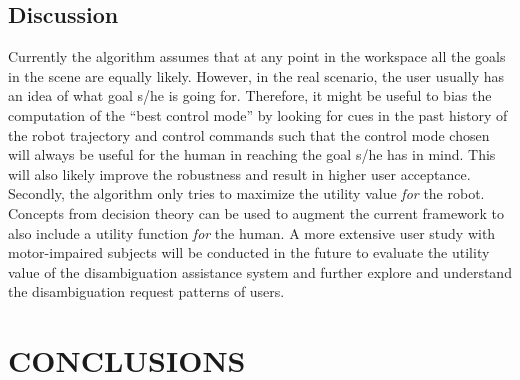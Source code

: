 \documentclass[conference]{IEEEtran}
\begin{document}
\subsection{Discussion}
Currently the algorithm assumes that at any point in the workspace all the goals in the scene are equally likely. However, in the real scenario, the user usually has an idea of what goal s/he is going for. Therefore, it might be useful to bias the computation of the ``best control mode'' by looking for cues in the past history of the robot trajectory and control commands such that the control mode chosen will always be useful for the human in reaching the goal s/he has in mind. This will also likely improve the robustness and result in higher user acceptance. 
Secondly, the algorithm only tries to maximize the utility value \textit{for} the robot. Concepts from decision theory can be used to augment the current framework to also include a utility function \textit{for} the human. A more extensive user study with motor-impaired subjects will be conducted in the future to evaluate the utility value of the disambiguation assistance system and further explore and understand the disambiguation request patterns of users. 
\section{CONCLUSIONS}\label{DC}
\end{document}
